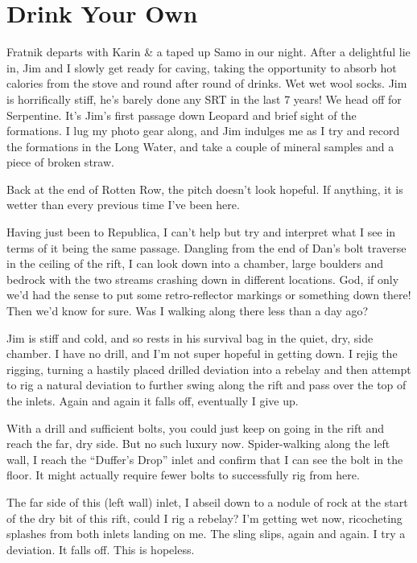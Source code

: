 
\hypertarget{drink-your-own}{%
\section{Drink Your Own}\label{drink-your-own}}

Fratnik departs with Karin \& a taped up Samo in our night. After a
delightful lie in, Jim and I slowly get ready for caving, taking the
opportunity to absorb hot calories from the stove and round after round
of drinks. Wet wet wool socks. Jim is horrifically stiff, he's barely
done any SRT in the last 7 years! We head off for Serpentine. It's Jim's
first passage down Leopard and brief sight of the formations. I lug my
photo gear along, and Jim indulges me as I try and record the formations
in the Long Water, and take a couple of mineral samples and a piece of
broken straw.

Back at the end of Rotten Row, the pitch doesn't look hopeful. If
anything, it is wetter than every previous time I've been here.

Having just been to Republica, I can't help but try and interpret what I
see in terms of it being the same passage. Dangling from the end of
Dan's bolt traverse in the ceiling of the rift, I can look down into a
chamber, large boulders and bedrock with the two streams crashing down
in different locations. God, if only we'd had the sense to put some
retro-reflector markings or something down there! Then we'd know for
sure. Was I walking along there less than a day ago?

Jim is stiff and cold, and so rests in his survival bag in the quiet,
dry, side chamber. I have no drill, and I'm not super hopeful in getting
down. I rejig the rigging, turning a hastily placed drilled deviation
into a rebelay and then attempt to rig a natural deviation to further
swing along the rift and pass over the top of the inlets. Again and
again it falls off, eventually I give up.

With a drill and sufficient bolts, you could just keep on going in the
rift and reach the far, dry side. But no such luxury now. Spider-walking
along the left wall, I reach the ``Duffer's Drop'' inlet and confirm
that I can see the bolt in the floor. It might actually require fewer
bolts to successfully rig from here.

The far side of this (left wall) inlet, I abseil down to a nodule of
rock at the start of the dry bit of this rift, could I rig a rebelay?
I'm getting wet now, ricocheting splashes from both inlets landing on
me. The sling slips, again and again. I try a deviation. It falls off.
This is hopeless.

